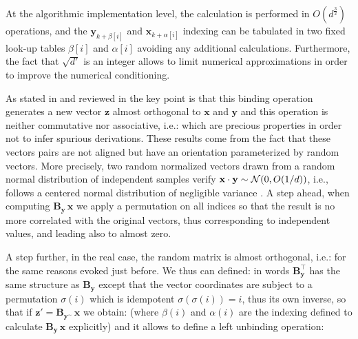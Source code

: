 At the algorithmic implementation level, the calculation is performed in $O\left(d^{\frac{3}{2}}\right)$ operations, and the $\mathbf{y}_{k + \beta[i]}$ and $\mathbf{x}_{k + \alpha[i]}$ indexing can be tabulated in two fixed look-up tables $\beta[i]$ and $\alpha[i]$ avoiding any additional calculations. Furthermore, the fact that $\sqrt{d'}$ is an integer allows to limit numerical approximations in order to improve the numerical conditioning.

As stated in \cite{gosmann_vector-derived_2019} and reviewed in \cite{mercier_ontology_2021} the key point is that this binding operation generates a new vector $\mathbf{z}$ almost orthogonal to $\mathbf{x}$ and $\mathbf{y}$ and this operation is neither commutative nor associative, i.e.:
which are precious properties in order not to infer spurious derivations. These results come from the fact that these vectors pairs are not aligned but have an orientation parameterized by random vectors. More precisely, two random normalized vectors drawn from a random normal distribution of independent samples verify ${\bf x} \cdot {\bf y} \sim {\mathcal N}(0, O(1/d))$, i.e., follows a centered normal distribution of negligible variance \cite{schlegel_comparison_2020}. A step ahead, when computing $\mathbf{B_y} \, \mathbf{x}$ we apply a permutation on all indices so that the result is no more correlated with the original vectors, thus corresponding to independent values, and leading also to almost zero.


A step further, in the real case, the random matrix is almost orthogonal, i.e.:
for the same reasons evoked just before. We thus can defined:
in words $\mathbf{B_y^\top}$ has the same structure as $\mathbf{B_y}$ except that the vector coordinates are subject to a permutation $\sigma(i)$ which is idempotent $\sigma(\sigma(i)) = i$, thus its own inverse, so that if 
$\mathbf{z'} = \mathbf{B_{y^\sim}} \, \mathbf{x}$ we obtain:
 (where $\beta(i)$ and $\alpha(i)$ are the indexing defined to calculate $\mathbf{B_{y}} \, \mathbf{x}$ explicitly) and it allows to define a left unbinding operation:

